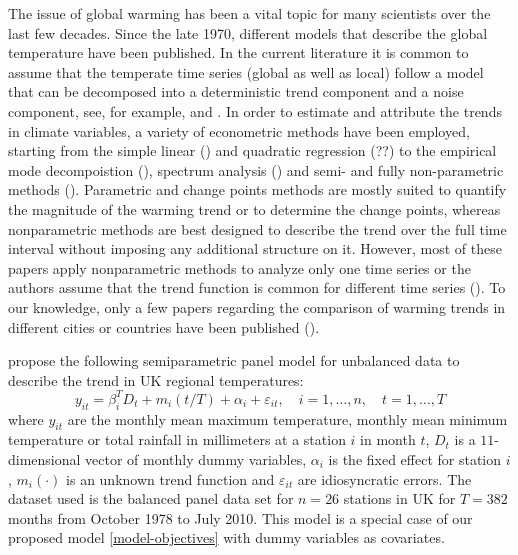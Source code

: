 \documentclass[a4paper,12pt]{article}
\begin{document}
\begin{itemize}[label=--,leftmargin=0.5cm]
\begin{example}
The issue of global warming has been a vital topic for many scientists over the last few decades. Since the late 1970, different models that describe the global temperature have been published. In the current literature it is common to assume that the temperate time series (global as well as local) follow a model that can be decomposed into a deterministic trend component and a noise component, see, for example, \cite{Ghil1991} and \cite{Mudelsee2018}. In order to estimate and attribute the trends in climate variables, a variety of econometric methods have been employed, starting from the simple linear (\cite{Yue2013}) and quadratic regression (??) to the empirical mode decompoistion (\cite{Wu2011}), spectrum analysis (\cite{Ghil1991}) and semi- and fully non-parametric methods (\cite{Gao2006}). Parametric and change points methods are mostly suited to quantify the magnitude of the warming trend or to determine the change points, whereas nonparametric methods are best designed to describe the trend over the full time interval without imposing any additional structure on it. However, most of these papers apply nonparametric methods to analyze only one time series or the authors assume that the trend function is common for different time series (\cite{Atak2011}). To our knowledge, only a few papers regarding the comparison of warming trends in different cities or countries have been published (\cite{Zhang2012}). 


\cite{Zhang2012} propose the following semiparametric panel model for unbalanced data to describe the trend in UK regional temperatures:
\begin{equation}\label{model-atak}
y_{it} =\beta_i^{T}D_t + m_i(t/T) + \alpha_i + \varepsilon_{it},\quad i =1, \ldots, n, \quad t=1, \ldots, T
\end{equation}
where $y_{it}$ are the monthly mean maximum temperature, monthly mean minimum temperature or total rainfall in millimeters at a station $i$ in month $t$, $D_t$ is a $11$-dimensional vector of monthly dummy variables, $\alpha_i$ is the fixed effect for station $i$, $m_i(\cdot)$ is an unknown trend function and $\varepsilon_{it}$ are idiosyncratic errors. The dataset used is the balanced panel data set for $n=26$ stations in UK for $T=382$ months from October 1978 to July 2010. This model is a special case of our proposed model \eqref{model-objectives} with dummy variables as covariates.


\end{example}
\end{itemize}
\end{document}
